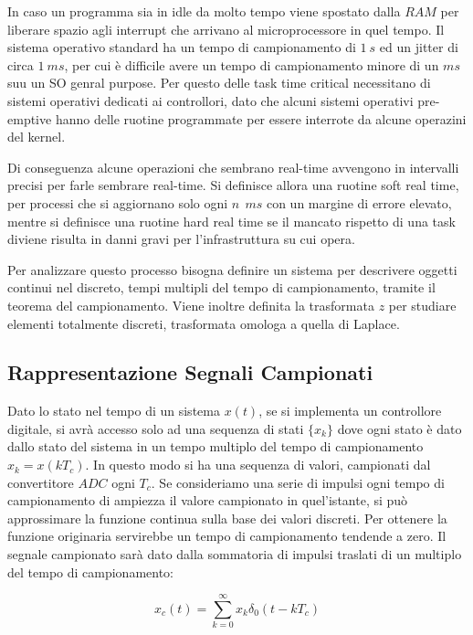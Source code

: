 \documentclass{article}
\numberwithin{equation}{subsection}
\begin{document}
In caso un programma 
sia in idle da molto tempo viene spostato dalla $RAM$ per liberare spazio agli interrupt che arrivano al microprocessore in quel tempo. Il sistema operativo standard ha un 
tempo di campionamento di $1\:s$ ed un jitter di circa $1\:ms$, per cui è difficile avere un tempo di campionamento minore di un $ms$ suu un SO genral purpose. Per questo 
delle task time critical necessitano di sistemi operativi dedicati ai controllori, dato che alcuni sistemi operativi pre-emptive hanno delle ruotine programmate per essere 
interrote da alcune operazini del kernel. 



Di conseguenza alcune operazioni che sembrano real-time avvengono in intervalli precisi per farle sembrare real-time. 
Si definisce allora una ruotine soft real time, per processi che si aggiornano solo ogni $n\:\:ms$ con un margine di errore elevato, mentre si definisce una ruotine hard real 
time se il mancato rispetto di una task diviene risulta in danni gravi per l'infrastruttura su cui opera. 



Per analizzare questo processo bisogna definire un sistema per descrivere oggetti continui nel discreto, tempi multipli del tempo di campionamento, tramite il teorema del 
campionamento. Viene inoltre definita la trasformata $z$ per studiare elementi totalmente discreti, trasformata omologa a quella di Laplace. 

\subsection{Rappresentazione Segnali Campionati}

Dato lo stato nel tempo di un sistema $x(t)$, se si implementa un controllore digitale, si avrà accesso solo ad una sequenza di stati $\{x_k\}$ dove ogni stato è dato dallo 
stato del sistema in un tempo multiplo del tempo di campionamento $x_k=x(kT_c)$. In questo modo si ha una sequenza di valori, campionati dal convertitore $ADC$ ogni $T_c$. Se 
consideriamo una serie di impulsi ogni tempo di campionamento di ampiezza il valore campionato in quel'istante, si può approssimare la funzione continua sulla base dei 
valori discreti. Per ottenere la funzione originaria servirebbe un tempo di campionamento tendende a zero. Il segnale campionato sarà dato 
dalla sommatoria di impulsi traslati di un multiplo del tempo di campionamento:

\begin{equation}
    x_c(t)=\sum_{k=0}^{\infty}x_k\delta_0(t-kT_c)
\end{equation}
\end{document}
